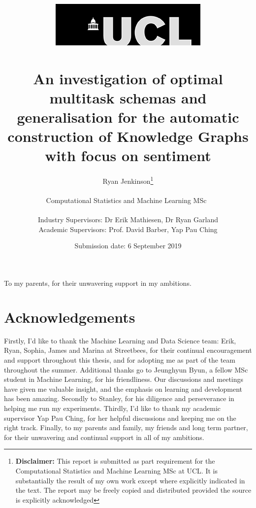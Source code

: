 \documentclass[11pt]{report}
\title{  	{ \includegraphics[scale=.5]{ucl_logo.png}}\\
{{\Huge \thesistitle}}\\
{\large An investigation of optimal multitask schemas and generalisation for the automatic construction of Knowledge Graphs with focus on sentiment}\\
		}
\date{Submission date: 6 September 2019}
\author{Ryan Jenkinson\thanks{
{\bf Disclaimer:}
This report is submitted as part requirement for the Computational Statistics and Machine Learning MSc at UCL. It is substantially the result of my own work except where explicitly indicated in the text. The report may be freely copied and distributed provided the source is explicitly acknowledged}
\\ \\
Computational Statistics and Machine Learning MSc\ \\ \\
Industry Supervisors: Dr Erik Mathiesen, Dr Ryan Garland \\
Academic Supervisors: Prof. David Barber, Yap Pau Ching
}
\theoremstyle{Definition}
\theoremstyle{remark}
\begin{document}
\onehalfspacing
\maketitle



\null{}
\begin{flushright}
	To my parents, for their unwavering support in my ambitions.
\end{flushright}
\null
\thispagestyle{empty}
\newpage

\chapter*{Acknowledgements}
Firstly, I'd like to thank the Machine Learning and Data Science team: Erik, Ryan, Sophia, James and Marina at Streetbees, for their continual encouragement and support throughout this thesis, and for adopting me as part of the team throughout the summer. Additional thanks go to Jeunghyun Byun, a fellow MSc student in Machine Learning, for his friendliness. Our discussions and meetings have given me valuable insight, and the emphasis on learning and development has been amazing. Secondly to Stanley, for his diligence and perseverance in helping me run my experiments. Thirdly, I'd like to thank my academic supervisor Yap Pau Ching, for her helpful discussions and keeping me on the right track. Finally, to my parents and family, my friends and long term partner, for their unwavering and continual support in all of my ambitions.
\end{document}
